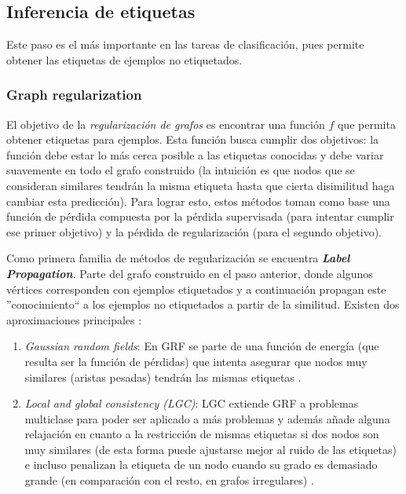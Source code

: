 \subsection{Inferencia de etiquetas}

Este paso es el más importante en las tareas de clasificación, pues permite obtener las etiquetas de ejemplos no etiquetados.

\subsubsection{Graph regularization}

El objetivo de la \textit{regularización de grafos} es encontrar una función $f$ que permita obtener etiquetas para ejemplos. Esta función busca cumplir dos objetivos: la función debe estar lo más cerca posible a las etiquetas conocidas y debe variar suavemente en todo el grafo construido (la intuición es que nodos que se consideran similares tendrán la misma etiqueta hasta que cierta disimilitud haga cambiar esta predicción). Para lograr esto, estos métodos toman como base una función de pérdida compuesta por la pérdida supervisada (para intentar cumplir ese primer objetivo) y la pérdida de regularización (para el segundo objetivo).


Como primera familia de métodos de regularización se encuentra \textbf{\textit{Label Propagation}}. Parte del grafo construido en el paso anterior, donde algunos vértices corresponden con ejemplos etiquetados y a continuación propagan este ''conocimiento`` a los ejemplos no etiquetados a partir de la similitud. Existen dos aproximaciones principales \cite{song2022graph}:
\begin{enumerate}
    \item \textit{Gaussian random fields}: En GRF se parte de una función de energía (que resulta ser la función de pérdidas) que intenta asegurar que nodos muy similares (aristas pesadas) tendrán las mismas etiquetas \cite{zhu2003semi}.
    \item \textit{Local and global consistency (LGC)}: LGC extiende GRF a problemas multiclase para poder ser aplicado a más problemas y además añade alguna relajación en cuanto a la restricción de mismas etiquetas si dos nodos son muy similares (de esta forma puede ajustarse mejor al ruido de las etiquetas) e incluso penalizan la etiqueta de un nodo cuando su grado es demasiado grande (en comparación con el resto, en grafos irregulares) \cite{zhou2003learning}.
\end{enumerate}

